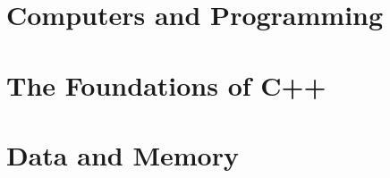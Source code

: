 
\part{Computers and Programming}



















\part{The Foundations of C++}







































\part{Data and Memory}

